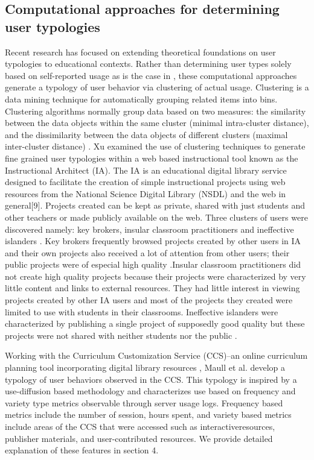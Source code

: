 \documentclass{acm_proc_article-sp}
\begin{document}
\subsection{Computational approaches for determining user typologies}
Recent research has focused on extending theoretical foundations on user typologies to educational contexts. Rather than determining user types solely based on self-reported usage as is the case in \cite{shih2004beyond,ram1990conceptualization}, these computational approaches generate a typology of user behavior via clustering of actual usage. Clustering is a data mining technique for automatically grouping related items into bins. Clustering algorithms normally group data based on two measures: the similarity between the data objects within the same cluster (minimal intra-cluster distance), and the dissimilarity between the data objects of different clusters (maximal inter-cluster distance) \cite{han2006data}. Xu \cite{xu} examined the use of clustering techniques to generate fine grained user typologies within a web based instructional tool known as the Instructional Architect (IA). The IA is an educational digital library service designed to facilitate the creation of simple instructional projects using web resources from the National Science Digital Library (NSDL) and the web in general[9]. Projects created can be kept as private, shared with just students and other teachers or made publicly available on the web. Three clusters of users were discovered namely: key brokers, insular classroom practitioners and ineffective islanders \cite{xu}.  Key brokers frequently browsed projects created by other users in IA and their own projects also received a lot of attention from other users; their public projects were of especial high quality \cite{xu}.Insular classroom practitioners did not create high quality projects because their projects were characterized by very little content and links to external resources. They had little interest in viewing projects created by other IA users and most of the projects they created were limited to use with students in their classrooms. Ineffective islanders were characterized by publishing a single project of supposedly good quality but these projects were not shared with neither students nor the public \cite{xu}.

Working with the Curriculum Customization Service (CCS)--an online curriculum planning tool incorporating digital library resources \cite{sumner:team}, Maull et al. \cite{maullunderstanding} develop a typology of user behaviors observed in the CCS. This typology is inspired by a use-diffusion based  methodology and characterizes use based on  frequency and variety type metrics observable through server usage logs. Frequency based metrics include the number of session, hours spent, and variety based metrics include areas of the CCS that were accessed such as interactiveresources, publisher materials, and user-contributed resources. We provide detailed explanation of these features in section 4. 
\end{document}
